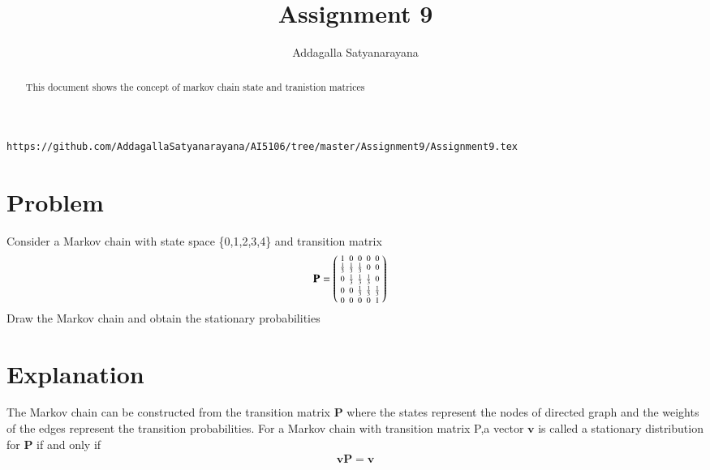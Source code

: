 \documentclass[journal,12pt,twocolumn]{IEEEtran}
\begin{document}
	\makeatother
	\let\StandardTheFigure\thefigure
	\let\vec\mathbf
	\renewcommand{\thefigure}{\theproblem}
	\def\putbox#1#2#3{\makebox[0in][l]{\makebox[#1][l]{}\raisebox{\baselineskip}[0in][0in]{\raisebox{#2}[0in][0in]{#3}}}}
	\def\rightbox#1{\makebox[0in][r]{#1}}
	\def\centbox#1{\makebox[0in]{#1}}
	\def\topbox#1{\raisebox{-\baselineskip}[0in][0in]{#1}}
	\def\midbox#1{\raisebox{-0.5\baselineskip}[0in][0in]{#1}}
	\vspace{3cm}
	\title{Assignment 9}
	\author{Addagalla Satyanarayana}
	\maketitle
	\newpage
	\bigskip
	\renewcommand{\thefigure}{\theenumi}
	\renewcommand{\thetable}{\theenumi}
\begin{abstract}
This document shows the concept of markov chain state and tranistion matrices
\end{abstract}

%
\begin{lstlisting}
https://github.com/AddagallaSatyanarayana/AI5106/tree/master/Assignment9/Assignment9.tex
\end{lstlisting}
%
\section{Problem}
	Consider a Markov chain with state space \{0,1,2,3,4\} and transition matrix 
\begin{align}
\vec{P}&=\myvec{
	1 & 0 & 0 & 0 & 0 \\
	\frac{1}{3} & \frac{1}{3} & \frac{1}{3} & 0 & 0 \\
	0 & \frac{1}{3} & \frac{1}{3} & \frac{1}{3} & 0 \\
	0 & 0 & \frac{1}{3} & \frac{1}{3} & \frac{1}{3} \\
	0 & 0 & 0 & 0 & 1
}\label{eq:Problem}
\end{align}
Draw the Markov chain and obtain the stationary probabilities
\section{Explanation}
 The Markov chain can be constructed from the transition matrix $\vec{P}$ where the states represent the nodes of  directed graph and the weights of the edges represent the transition probabilities. 
For a Markov chain with transition matrix P,a vector $\vec{v}$  is called a stationary distribution for $\vec{P}$ if and only if
\begin{align}
\vec{v}\vec{P}= \vec{v}\label{eq:stationary}
\end{align}
\end{document}
